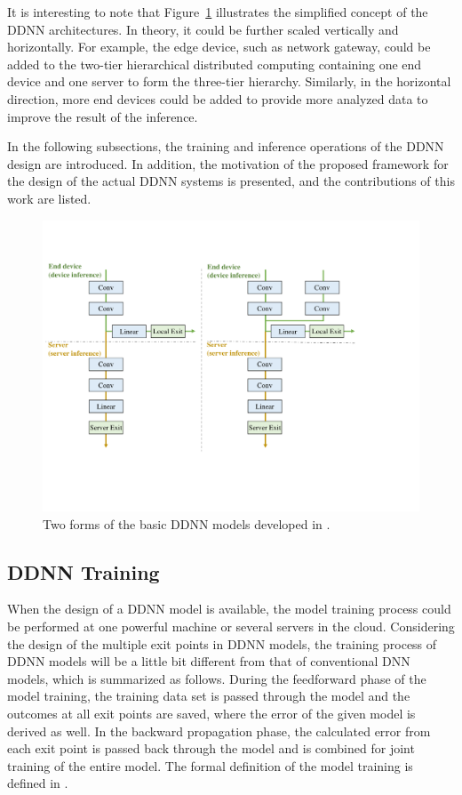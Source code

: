 \documentclass[format=acmsmall, review=false, screen=true]{acmart}
\def\figurename{Figure}
\begin{document}
It is interesting to note that \figurename~\ref{fig:ddnnmodels} illustrates the simplified concept of the DDNN architectures. In theory, it could be further scaled vertically and horizontally. For example, the edge device, such as network gateway, could be added to the two-tier hierarchical distributed computing containing one end device and one server to form the three-tier hierarchy. Similarly, in the horizontal direction, more end devices could be added to provide more analyzed data to improve the result of the inference.

In the following subsections, the training and inference operations of the DDNN design are introduced. In addition, the motivation of the proposed framework for the design of the actual DDNN systems is presented, and the contributions of this work are listed.

	\begin{figure}[htb!]
        \centering

        \includegraphics[width=.7\columnwidth]{figure/DDNN_models.pdf}

        \caption{Two forms of the basic DDNN models developed in \cite{Teerapittayanon17}.}
        \label{fig:ddnnmodels} %
    \end{figure}

\subsection{DDNN Training}
When the design of a DDNN model is available, the model training process could be performed at one powerful machine or several servers in the cloud.  Considering the design of the multiple exit points in DDNN models, the training process of DDNN models will be a little bit different from that of conventional DNN models, which is summarized as follows. During the feedforward phase of the model training, the training data set is passed through the model and the outcomes at all exit points are saved, where the error of the given model is derived as well. In the backward propagation phase, the calculated error from each exit point is passed back through the model and is combined for joint training of the entire model. The formal definition of the model training is defined in \cite{Teerapittayanon17}.
\end{document}
